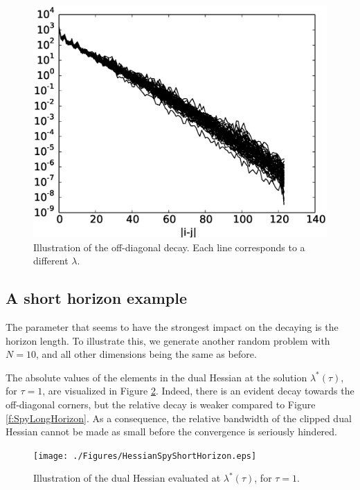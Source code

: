\begin{figure}[h]
\centering
\includegraphics[scale=0.4]{./Figures/HessianDecayLongHorizon.eps}
\caption{Illustration of the off-diagonal decay. Each line corresponds to a different $\lambda$.}
\label{f:HessianDecayLongHorizon}
\end{figure}

\subsection{A short horizon example}

The parameter that seems to have the strongest impact on the decaying is the horizon length. To illustrate this, we generate another random problem with $N=10$, and all other dimensions being the same as before.

The absolute values of the elements in the dual Hessian at the solution $\lambda^*(\tau)$, for $\tau = 1$, are visualized in Figure \ref{f:SpyShortHorizon}. Indeed, there is an evident decay towards the off-diagonal corners, but the relative decay is weaker compared to Figure \ref{f:SpyLongHorizon}. As a consequence, the relative bandwidth of the clipped dual Hessian cannot be made as small before the convergence is seriously hindered.

\begin{figure}[h]
\centering
\texttt{[image: ./Figures/HessianSpyShortHorizon.eps]}
\caption{Illustration of the dual Hessian evaluated at $\lambda^*(\tau)$, for $\tau=1$.}
\label{f:SpyShortHorizon}
\end{figure}

